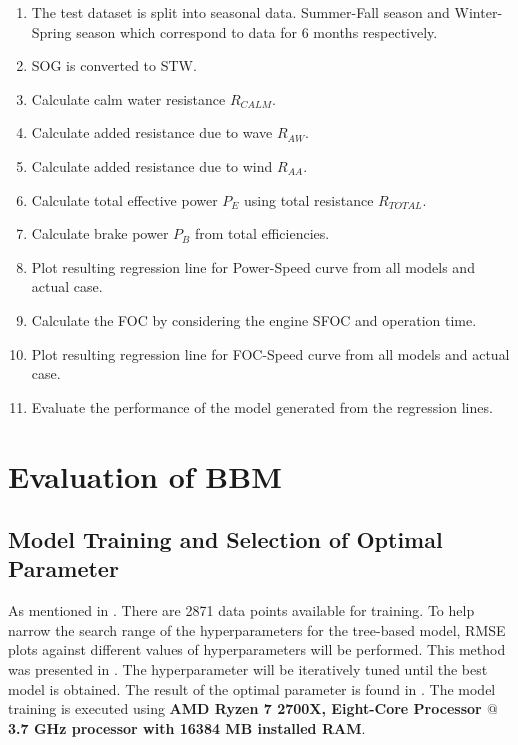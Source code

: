 \begin{enumerate}
    \setlength\itemsep{0em}
    \item The test dataset is split into seasonal data. Summer-Fall season and Winter-Spring season which correspond to data for 6 months respectively.
    \item SOG is converted to STW.
    \item Calculate calm water resistance $R_{CALM}$.
    \item Calculate added resistance due to wave $R_{AW}$.
    \item Calculate added resistance due to wind $R_{AA}$.
    \item Calculate total effective power $P_E$ using total resistance $R_{TOTAL}$.
    \item Calculate brake power $P_B$ from total efficiencies.
    \item Plot resulting regression line for Power-Speed curve from all models and actual case. 
    \item Calculate the FOC by considering the engine SFOC and operation time.
    \item Plot resulting regression line for FOC-Speed curve from all models and actual case.
    \item Evaluate the performance of the model generated from the regression lines.
\end{enumerate}

\section{Evaluation of BBM}\label{sec:BBM_tree_evaluate}

\subsection*{Model Training and Selection of Optimal Parameter}\label{sec:hpo_select_train}

As mentioned in . There are 2871 data points available for training. To help narrow the search range of the hyperparameters for the tree-based model, RMSE plots against different values of hyperparameters will be performed. This method was presented in . The hyperparameter will be iteratively tuned until the best model is obtained. The result of the optimal parameter is found in . The model training is executed using \textbf{AMD Ryzen 7 2700X, Eight-Core Processor $@$ 3.7 GHz processor with 16384 MB installed RAM}.\\



